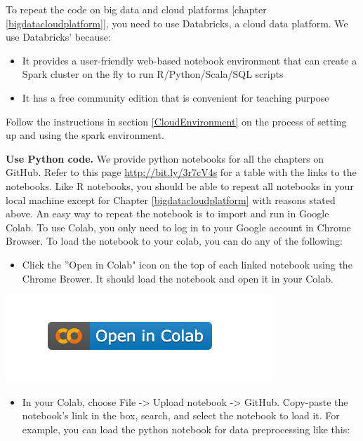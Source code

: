 \documentclass[12pt,]{krantz}
\providecommand{\tightlist}{%
  \setlength{\itemsep}{0pt}\setlength{\parskip}{0pt}}
\begin{document}
To repeat the code on big data and cloud platforms {[}chapter \ref{bigdatacloudplatform}{]}, you need to use Databricks, a cloud data platform. We use Databricks' because:

\begin{itemize}
\tightlist
\item
  It provides a user-friendly web-based notebook environment that can create a Spark cluster on the fly to run R/Python/Scala/SQL scripts
\item
  It has a free community edition that is convenient for teaching purpose
\end{itemize}

Follow the instructions in section \ref{CloudEnvironment} on the process of setting up and using the spark environment.

\textbf{Use Python code.} We provide python notebooks for all the chapters on GitHub. Refer to this page \url{http://bit.ly/3r7cV4s} for a table with the links to the notebooks. Like R notebooks, you should be able to repeat all notebooks in your local machine except for Chapter \ref{bigdatacloudplatform} with reasons stated above. An easy way to repeat the notebook is to import and run in Google Colab. To use Colab, you only need to log in to your Google account in Chrome Browser. To load the notebook to your colab, you can do any of the following:

\begin{itemize}
\tightlist
\item
  Click the ''Open in Colab" icon on the top of each linked notebook using the Chrome Brower. It should load the notebook and open it in your Colab.
\end{itemize}

\begin{center}\includegraphics[width=0.35\linewidth]{images/colabicon} \end{center}

\begin{itemize}
\tightlist
\item
  In your Colab, choose File -\textgreater{} Upload notebook -\textgreater{} GitHub. Copy-paste the notebook's link in the box, search, and select the notebook to load it. For example, you can load the python notebook for data preprocessing like this:
\end{itemize}
\end{document}
